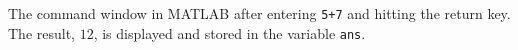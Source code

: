\label{fig:CommandWindow} The command window in MATLAB after entering \lstinline{5+7} and hitting the return key. The result, $12$, is displayed and stored in the variable \lstinline{ans}.